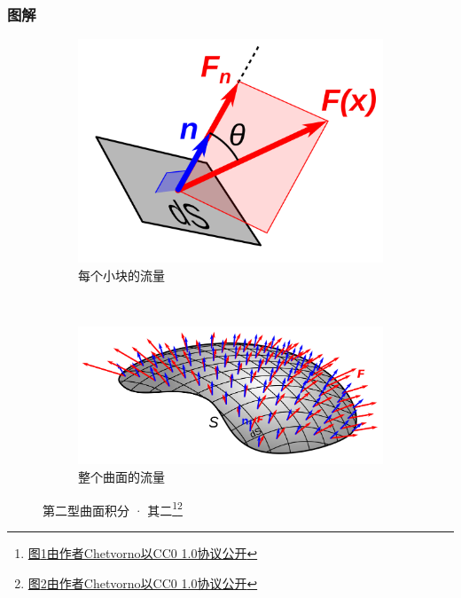 \documentclass[xetex]{beamer}
\begin{document}
    \begin{frame}
        \frametitle{图解}
    
        \begin{figure}[ht]
            \centering
            \begin{subfigure}[b]{.4\textwidth}
                \includegraphics[width=\textwidth]{img/1280px-Surface_integral_-_normal_component_of_field.svg.png}
                \caption{每个小块的流量}
                \label{fig:intplate-2a}
            \end{subfigure}
            ~
            \begin{subfigure}[b]{.4\textwidth}
                \includegraphics[width=\textwidth]{img/1280px-Surface_integral_-_definition.svg.png}
                \caption{整个曲面的流量}
                \label{fig:intplate-2b}
            \end{subfigure}
            \caption{第二型曲面积分 · 其二\footnote[1]{\href{https://commons.wikimedia.org/wiki/File:Surface_integral_-_normal_component_of_field.svg}{图\ref{fig:intplate-2a}由作者Chetvorno以CC0 1.0协议公开}}\footnote[2]{\href{https://commons.wikimedia.org/wiki/File:Surface_integral_-_definition.svg}{图\ref{fig:intplate-2b}由作者Chetvorno以CC0 1.0协议公开}}}
            \label{fig:intplate-1}
        \end{figure}
    
    \end{frame}
\end{document}
